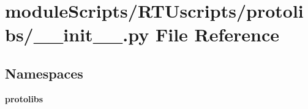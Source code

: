 \section{module\+Scripts/\+R\+T\+Uscripts/protolibs/\+\_\+\+\_\+init\+\_\+\+\_\+.py File Reference}
\label{protolibs_2____init_____8py}
\subsection*{Namespaces}
\begin{DoxyCompactItemize}
\item 
 {\bf protolibs}
\end{DoxyCompactItemize}

